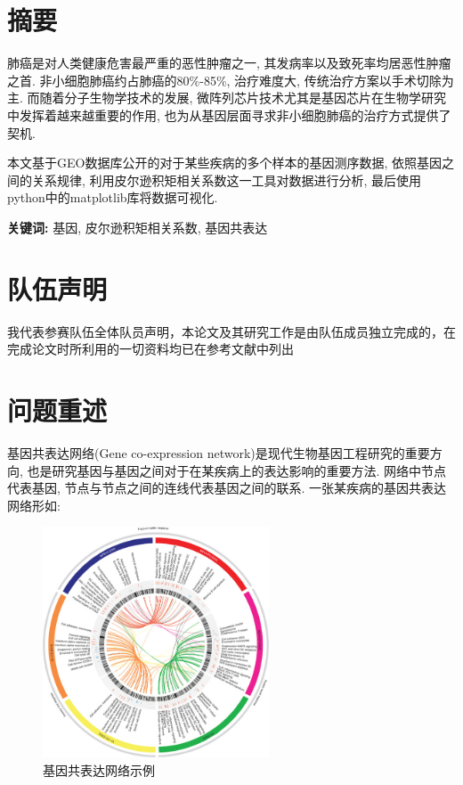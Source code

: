 \documentclass[zihao=-4]{ctexart}
\begin{document}
\section*{摘要}

肺癌是对人类健康危害最严重的恶性肿瘤之一, 其发病率以及致死率均居恶性肿瘤之首. 非小细胞肺癌约占肺癌的80\%-85\%, 治疗难度大, 传统治疗方案以手术切除为主. 而随着分子生物学技术的发展, 微阵列芯片技术尤其是基因芯片在生物学研究中发挥着越来越重要的作用, 也为从基因层面寻求非小细胞肺癌的治疗方式提供了契机. 

本文基于GEO数据库公开的对于某些疾病的多个样本的基因测序数据, 依照基因之间的关系规律, 利用皮尔逊积矩相关系数这一工具对数据进行分析, 最后使用python中的matplotlib库将数据可视化.

\textbf{关键词:} 基因, 皮尔逊积矩相关系数, 基因共表达

\newpage

\section*{队伍声明}

我代表参赛队伍全体队员声明，本论文及其研究工作是由队伍成员独立完成的，在完成论文时所利用的一切资料均已在参考文献中列出 
\newpage
\renewcommand{\headrulewidth}{0.4pt} %
\setcounter{page}{1} 

\tableofcontents

\section{问题重述}
基因共表达网络(Gene co-expression network)是现代生物基因工程研究的重要方向, 也是研究基因与基因之间对于在某疾病上的表达影响的重要方法. 网络中节点代表基因, 节点与节点之间的连线代表基因之间的联系. 一张某疾病的基因共表达网络形如:
\begin{figure}[H]
    \centering
    \includegraphics[width=0.6\textwidth]{pic/example.jpg}
    \caption{基因共表达网络示例\cite{example}}
\end{figure}
\end{document}
